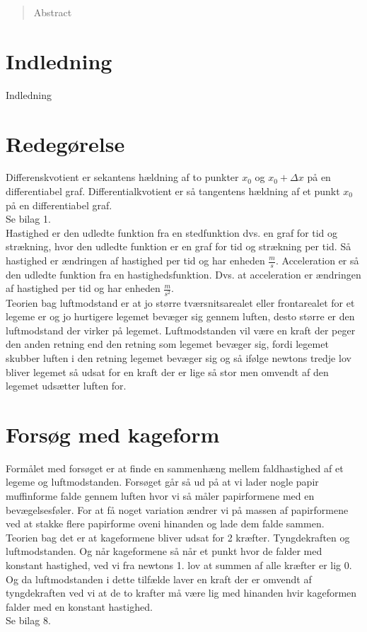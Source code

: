 \documentclass[12pt]{article}
\begin{document}
\begin{abstract}
Abstract
\end{abstract}
\pagebreak

\tableofcontents
\pagebreak

\section{Indledning}
Indledning

\section{Redegørelse}
Differenskvotient er sekantens hældning af to punkter $x_{0}$ og $x_{0}+\Delta x$ på en differentiabel graf.
Differentialkvotient er så tangentens hældning af et punkt $x_{0}$ på en differentiabel graf.\\
Se bilag 1.\\
Hastighed er den udledte funktion fra en stedfunktion dvs. en graf for tid og strækning, hvor den udledte funktion er en graf for tid og strækning per tid. Så hastighed er ændringen af hastighed per tid og har enheden $\frac{m}{s}$.
Acceleration er så den udledte funktion fra en hastighedsfunktion. Dvs. at acceleration er ændringen af hastighed per tid og har enheden $\frac{m}{s^2}$.\\
Teorien bag luftmodstand er at jo større tværsnitsarealet eller frontarealet for et legeme er og jo hurtigere legemet bevæger sig gennem luften, desto større er den luftmodstand der virker på legemet. Luftmodstanden vil være en kraft der peger den anden retning end den retning som legemet bevæger sig,
fordi legemet skubber luften i den retning legemet bevæger sig og så ifølge newtons tredje lov bliver legemet så udsat for en kraft der er lige så stor men omvendt af den legemet udsætter luften for.


\section{Forsøg med kageform}
Formålet med forsøget er at finde en sammenhæng mellem faldhastighed af et legeme og luftmodstanden. Forsøget går så ud på at vi lader nogle papir muffinforme falde gennem luften
hvor vi så måler papirformene med en bevægelsesføler. For at få noget variation ændrer vi på massen af papirformene ved at stakke flere papirforme oveni hinanden og lade dem falde sammen.\\
Teorien bag det er at kageformene bliver udsat for 2 kræfter. Tyngdekraften og luftmodstanden. Og når kageformene så når et punkt hvor de falder med konstant hastighed, ved vi fra newtons 1. lov
at summen af alle kræfter er lig 0. Og da luftmodstanden i dette tilfælde laver en kraft der er omvendt af tyngdekraften ved vi at de to krafter må være lig med hinanden hvir kageformen falder med
en konstant hastighed.\\
Se bilag 8.
\end{document}
